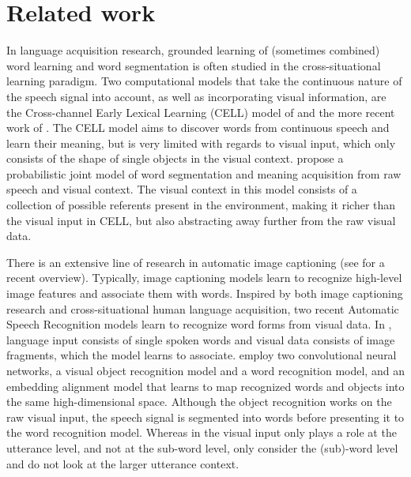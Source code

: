 \section{Related work}

In language acquisition research, grounded learning of (sometimes combined) word learning and word segmentation is often studied in the cross-situational learning paradigm. %
Two computational models that take the continuous nature of the speech signal into account, as well as incorporating visual information, are the Cross-channel Early Lexical Learning (CELL) model of  and the more recent work of . The CELL model aims to discover words from continuous speech and learn their meaning, but is very limited with regards to visual input, which only consists of the shape of single objects in the visual context.  propose a probabilistic joint model of word segmentation and meaning acquisition from raw speech and visual context. The visual context in this model consists of a collection of possible referents present in the environment, making it richer than the visual input in CELL, but also abstracting away further from the raw visual data. 

There is an extensive line of research in automatic image captioning (see  for a recent overview). Typically, image captioning models learn to recognize high-level image features and associate them with words. Inspired by both image captioning research and cross-situational human language acquisition, two recent Automatic Speech Recognition models learn to recognize word forms from visual data. In , language input consists of single spoken words and visual data consists of image fragments, which the model learns to associate.  employ two convolutional neural networks, a visual object recognition model and a word recognition model, and an embedding alignment model that learns to map recognized words and objects into the same high-dimensional space. Although the object recognition works on the raw visual input, the speech signal is segmented into words before presenting it to the word recognition model. Whereas in  the visual input only plays a role at the utterance level, and not at the sub-word level,  only consider the (sub)-word level and do not look at the larger utterance context. 

